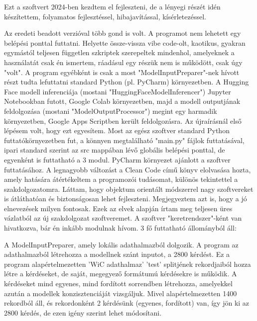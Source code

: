 \usepackage{graphicx}\begin{Document}
                         Ezt a szoftvert 2024-ben kezdtem el fejleszteni, de a lényegi részét idén készítettem, folyamatos fejlesztéssel, hibajavítással, kísérletezéssel.


                         Az eredeti beadott verzióval több gond is volt. A programot nem lehetett egy belépési ponttal futtatni. Helyette össze-vissza vibe code-olt, kaotikus, gyakran egymástól teljesen független szkriptek szerepeltek mindenhol, amelyeknek a használatát csak én ismertem, ráadásul egy részük nem is működött, csak úgy "volt". A program egyébként is csak a most "ModelInputPreparer"-nek hívott részt tudta lefuttatni standard Python (pl. PyCharm) környezetben. A Hugging Face modell inferenciája (mostani "HuggingFaceModelInferencer") Jupyter Notebookban futott, Google Colab környezetben, majd a modell outputjának feldolgozása (mostani "ModelOutputProcessor") megint egy harmadik környezetben, Google Apps Scriptben került feldolgozásra.
                         Az újraírásnál első lépésem volt, hogy ezt egyesítem. Most az egész szoftver standard Python futtatókörnyezetben fut, a könnyen megtalálható "main.py" fájlok futtatásával, ipari standard szerint az src mappában lévő globális belépési ponttal, de egyenként is futtatható a 3 modul. PyCharm környezet ajánlott a szoftver futtatásához.
                         A legnagyobb változást a Clean Code című könyv elolvasása hozta, amely hatására átértékeltem a programozói tudásomat, különös tekintettel a szakdolgozatomra. Láttam, hogy objektum orientált módszerrel nagy szoftvereket is átláthatóan és biztonságosan lehet fejleszteni. Megjegyeztem azt is, hogy a jó elnevezések milyen fontosak. Ezek az elvek alapján írtam meg teljesen üres vázlatból az új szakdolgozat szoftveremet.
                         A szoftver "keretrendszer"-ként van hivatkozva, bár én inkább modulnak hívom. 3 fő futtatható állományból áll:

                         A ModelInputPreparer, amely lokális adathalmazból dolgozik. A program az adathalmazból létrehozza a modellnek szánt inputot, a 2800 kérdést. Ez a program alapértelmezetten 'WiC adathalmaz' 'test' splitjének rekordjaiból hozza létre a kérdéseket, de saját, megegyező formátumú kérdésekre is működik. A kérdéseket mind egyenes, mind fordított sorrendben létrehozza, amelyekkel azután a modellek konzisztenciáját vizsgáljuk. Mivel alapértelmezetten 1400 rekordból áll, és rekordonként 2 kérdésünk (egyenes, fordított) van, így jön ki az 2800 kérdés, de ezen igény szerint lehet módosítani.


\end{Document}
